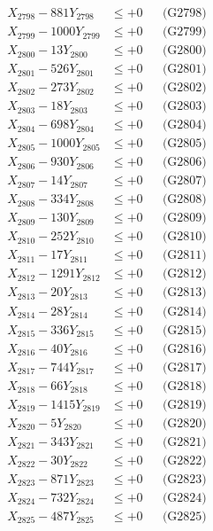 \documentclass[a4paper,10pt]{article}
\begin{document}
{\begin{align}
X_{2798} - 881Y_{2798} &\leq +0 && \text{(G2798)} \\
X_{2799} - 1000Y_{2799} &\leq +0 && \text{(G2799)} \\
X_{2800} - 13Y_{2800} &\leq +0 && \text{(G2800)} \\
\allowbreak
X_{2801} - 526Y_{2801} &\leq +0 && \text{(G2801)} \\
X_{2802} - 273Y_{2802} &\leq +0 && \text{(G2802)} \\
X_{2803} - 18Y_{2803} &\leq +0 && \text{(G2803)} \\
X_{2804} - 698Y_{2804} &\leq +0 && \text{(G2804)} \\
X_{2805} - 1000Y_{2805} &\leq +0 && \text{(G2805)} \\
X_{2806} - 930Y_{2806} &\leq +0 && \text{(G2806)} \\
X_{2807} - 14Y_{2807} &\leq +0 && \text{(G2807)} \\
X_{2808} - 334Y_{2808} &\leq +0 && \text{(G2808)} \\
X_{2809} - 130Y_{2809} &\leq +0 && \text{(G2809)} \\
X_{2810} - 252Y_{2810} &\leq +0 && \text{(G2810)} \\
\allowbreak
X_{2811} - 17Y_{2811} &\leq +0 && \text{(G2811)} \\
X_{2812} - 1291Y_{2812} &\leq +0 && \text{(G2812)} \\
X_{2813} - 20Y_{2813} &\leq +0 && \text{(G2813)} \\
X_{2814} - 28Y_{2814} &\leq +0 && \text{(G2814)} \\
X_{2815} - 336Y_{2815} &\leq +0 && \text{(G2815)} \\
X_{2816} - 40Y_{2816} &\leq +0 && \text{(G2816)} \\
X_{2817} - 744Y_{2817} &\leq +0 && \text{(G2817)} \\
X_{2818} - 66Y_{2818} &\leq +0 && \text{(G2818)} \\
X_{2819} - 1415Y_{2819} &\leq +0 && \text{(G2819)} \\
X_{2820} - 5Y_{2820} &\leq +0 && \text{(G2820)} \\
\allowbreak
X_{2821} - 343Y_{2821} &\leq +0 && \text{(G2821)} \\
X_{2822} - 30Y_{2822} &\leq +0 && \text{(G2822)} \\
X_{2823} - 871Y_{2823} &\leq +0 && \text{(G2823)} \\
X_{2824} - 732Y_{2824} &\leq +0 && \text{(G2824)} \\
X_{2825} - 487Y_{2825} &\leq +0 && \text{(G2825)} \\

\end{align}}
\end{document}

